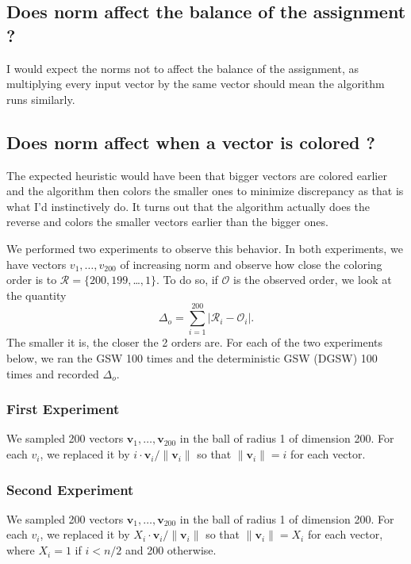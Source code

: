 \documentclass[12pt]{article}
\begin{document}
\subsection{Does norm affect the balance of the assignment ?}
I would expect the norms not to affect the balance of the assignment, as multiplying every input vector by the same vector should mean the algorithm runs similarly.

\subsection{Does norm affect when a vector is colored ?}\label{norm_affect_when}
The expected heuristic would have been that bigger vectors are colored earlier and the algorithm then colors the smaller ones to minimize discrepancy as that is what I'd instinctively do. It turns out that the algorithm actually does the reverse and colors the smaller vectors earlier than the bigger ones.

We performed two experiments to observe this behavior. In both experiments, we have vectors $v_1,\dots,v_200$ of increasing norm and observe how close the coloring order is to $\mathcal{R}=\{200,199,$\dots$,1\}$. To do so, if $\mathcal{O}$ is the observed order, we look at the quantity 
\begin{equation}
\Delta_{o}=\sum_{i=1}^{200}|\mathcal{R}_i-\mathcal{O}_i|.
\label{orderdistance}
\end{equation}
The smaller it is, the closer the 2 orders are. For each of the two experiments below, we ran the GSW 100 times and the deterministic GSW (DGSW) 100 times and recorded $\Delta_o$.

\subsubsection{First Experiment}
We sampled 200 vectors $\textbf{v}_1,\dots,\textbf{v}_{200}$ in the ball of radius 1 of dimension 200. For each $v_i$, we replaced it by $i\cdot \textbf{v}_i/\|\textbf{v}_i\|$ so that $\|\textbf{v}_i\|=i$ for each vector. 

\subsubsection{Second Experiment}
We sampled 200 vectors $\textbf{v}_1,\dots,\textbf{v}_{200}$ in the ball of radius 1 of dimension 200. For each $v_i$, we replaced it by $X_i\cdot \textbf{v}_i/\|\textbf{v}_i\|$ so that $\|\textbf{v}_i\|=X_i$ for each vector, where $X_i=1$ if $i<n/2$ and 200 otherwise.
\end{document}
